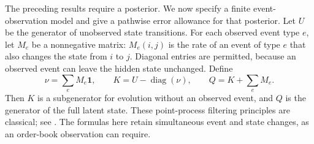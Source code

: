 \documentclass[11pt]{article}
\theoremstyle{plain}
\theoremstyle{definition}
\theoremstyle{remark}
\begin{document}
The preceding results require a posterior. We now specify a finite
event-observation model and give a pathwise error allowance for that
posterior. Let \(U\) be the generator of unobserved state transitions.
For each observed event type \(e\), let \(M_e\) be a nonnegative matrix:
\(M_e(i,j)\) is the rate of an event of type \(e\) that also changes
the state from \(i\) to \(j\). Diagonal entries are permitted, because
an observed event can leave the hidden state unchanged. Define
\begin{equation}\label{eq:eventfiltermatrices}
 \nu=\sum_e M_e\mathbf1,\qquad
 K=U-\operatorname{diag}(\nu),\qquad
 Q=K+\sum_e M_e.
\end{equation}
Then \(K\) is a subgenerator for evolution without an observed event,
and \(Q\) is the generator of the full latent state. These
point-process filtering principles are classical; see
\citet{Snyder1972}. The formulas here retain simultaneous event and
state changes, as an order-book observation can require.
\end{document}
